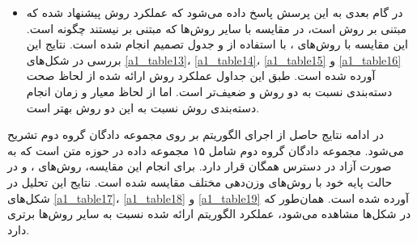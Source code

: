 \documentclass[12pt, a4paper]{article}
\begin{document}
\begin{itemize}
    \item در گام بعدی به این پرسش پاسخ داده می‌شود که عملکرد روش پیشنهاد شده
          که مبتنی بر روش  است، در مقایسه با سایر روش‌ها که
          مبتنی بر  نیستند چگونه است. این مقایسه با روش‌های
          ،  با استفاده از 
           و جدول تصمیم انجام شده است. نتایج این بررسی در شکل‌های
          \ref{a1_table13}، \ref{a1_table14}، \ref{a1_table15} و \ref{a1_table16}
          آورده شده است. طبق این جداول عملکرد روش ارائه شده از لحاظ صحت دسته‌بندی نسبت به دو
          روش  و  ضعیف‌تر است. اما از لحاظ معیار  و
          زمان انجام دسته‌بندی روش  نسبت به این دو روش بهتر است.
\end{itemize}

در ادامه نتایج حاصل از اجرای الگوریتم بر روی مجموعه دادگان گروه دوم تشریح می‌شود.
مجموعه دادگان گروه دوم شامل ۱۵ مجموعه داده در حوزه متن است که به صورت آزاد در
دسترس همگان قرار دارد. برای انجام این مقایسه، روش‌های ،  و
 در حالت پایه خود با روش‌های وزن‌دهی مختلف مقایسه شده است. نتایج این تحلیل
در شکل‌های \ref{a1_table17}، \ref{a1_table18} و \ref{a1_table19} آورده شده است.
همان‌طور که در شکل‌ها مشاهده می‌شود، عملکرد الگوریتم ارائه شده نسبت به سایر روش‌ها
برتری دارد.

\clearpage
\end{document}
